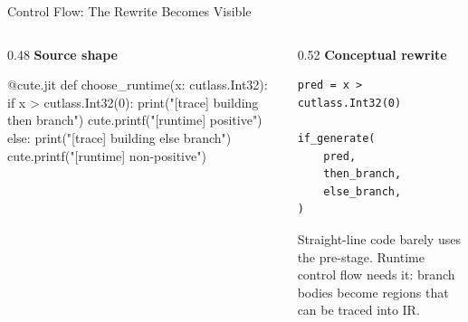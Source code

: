 \documentclass[aspectratio=169,11pt]{beamer}
\begin{document}
\begin{frame}[fragile]{Control Flow: The Rewrite Becomes Visible}
\begin{columns}[T,totalwidth=\textwidth]
  \begin{column}{0.48\textwidth}
    \small\textbf{Source shape}
\begin{TraceCode}
@cute.jit
def choose_runtime(x: cutlass.Int32):
    if x > cutlass.Int32(0):
        print("[trace] building then branch")
        cute.printf("[runtime] positive\n")
    else:
        print("[trace] building else branch")
        cute.printf("[runtime] non-positive\n")
\end{TraceCode}
  \end{column}
  \begin{column}{0.52\textwidth}
    \small\textbf{Conceptual rewrite}
\begin{lstlisting}[style=traceir]
pred = x > cutlass.Int32(0)

if_generate(
    pred,
    then_branch,
    else_branch,
)
\end{lstlisting}

    \vspace{0.45em}
    \footnotesize\color{TraceNote}
    Straight-line code barely uses the pre-stage. Runtime control flow needs it:
    branch bodies become regions that can be traced into IR.
  \end{column}
\end{columns}
\end{frame}
\end{document}
